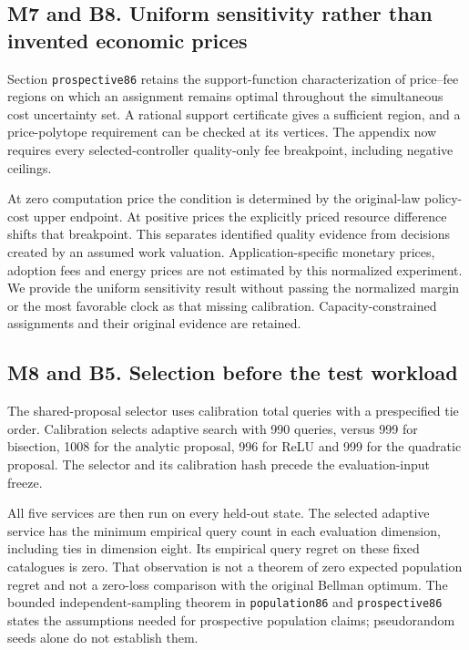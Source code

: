 \hypertarget{m7-and-b8.-uniform-sensitivity-rather-than-invented-economic-prices}{%
\subsection{M7 and B8. Uniform sensitivity rather than invented economic
prices}\label{m7-and-b8.-uniform-sensitivity-rather-than-invented-economic-prices}}

Section \texttt{prospective86} retains the support-function
characterization of price--fee regions on which an assignment remains
optimal throughout the simultaneous cost uncertainty set. A rational
support certificate gives a sufficient region, and a price-polytope
requirement can be checked at its vertices. The appendix now requires
every selected-controller quality-only fee breakpoint, including
negative ceilings.

At zero computation price the condition is determined by the
original-law policy-cost upper endpoint. At positive prices the
explicitly priced resource difference shifts that breakpoint. This
separates identified quality evidence from decisions created by an
assumed work valuation. Application-specific monetary prices, adoption
fees and energy prices are not estimated by this normalized experiment.
We provide the uniform sensitivity result without passing the normalized
margin or the most favorable clock as that missing calibration.
Capacity-constrained assignments and their original evidence are
retained.

\hypertarget{m8-and-b5.-selection-before-the-test-workload}{%
\subsection{M8 and B5. Selection before the test
workload}\label{m8-and-b5.-selection-before-the-test-workload}}

The shared-proposal selector uses calibration total queries with a
prespecified tie order. Calibration selects adaptive search with 990
queries, versus 999 for bisection, 1008 for the analytic proposal, 996
for ReLU and 999 for the quadratic proposal. The selector and its
calibration hash precede the evaluation-input freeze.

All five services are then run on every held-out state. The selected
adaptive service has the minimum empirical query count in each
evaluation dimension, including ties in dimension eight. Its empirical
query regret on these fixed catalogues is zero. That observation is not
a theorem of zero expected population regret and not a zero-loss
comparison with the original Bellman optimum. The bounded
independent-sampling theorem in \texttt{population86} and
\texttt{prospective86} states the assumptions needed for prospective
population claims; pseudorandom seeds alone do not establish them.

